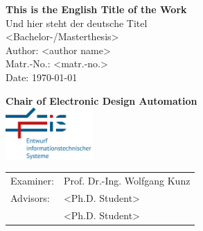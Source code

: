 \begin{titlepage} %

    \centering %
	\vspace*{3\baselineskip} %
	
	\textcolor{rptudunkelblau}{\LARGE \textbf{This is the English Title of the Work}\\} 
	\vspace{1\baselineskip} %
	\textcolor{rptudunkelblau}{\Large Und hier steht der deutsche Titel\\} 
	\vspace{5\baselineskip} %
	\textcolor{rptudunkelblau}{\Large <Bachelor-/Masterthesis>\\} 
	\vspace{1\baselineskip} %
	\textcolor{rptudunkelblau}{\Large Author: <author name>\\} 
	\vspace{1\baselineskip} %
	\textcolor{rptudunkelblau}{\Large Matr.-No.: <matr.-no.>\\} 
	\vspace{1\baselineskip} %
	\textcolor{rptudunkelblau}{\Large Date: \today\\} 
	
	\vspace{4\baselineskip} %
	\textcolor{rptudunkelblau}{\Large \textbf{Chair of Electronic Design Automation}\\}
	\vspace{1\baselineskip}
    \includegraphics[width=0.25\textwidth]{images/EIS-Logo.png}\\
    \vspace{3\baselineskip}
	\textcolor{rptudunkelblau}{\Large \begin{tabular}{ll}
		Examiner: & Prof. Dr.-Ing. Wolfgang Kunz\\
		Advisors: & <Ph.D. Student>\\
		& <Ph.D. Student>
	\end{tabular}}
	
\end{titlepage}
